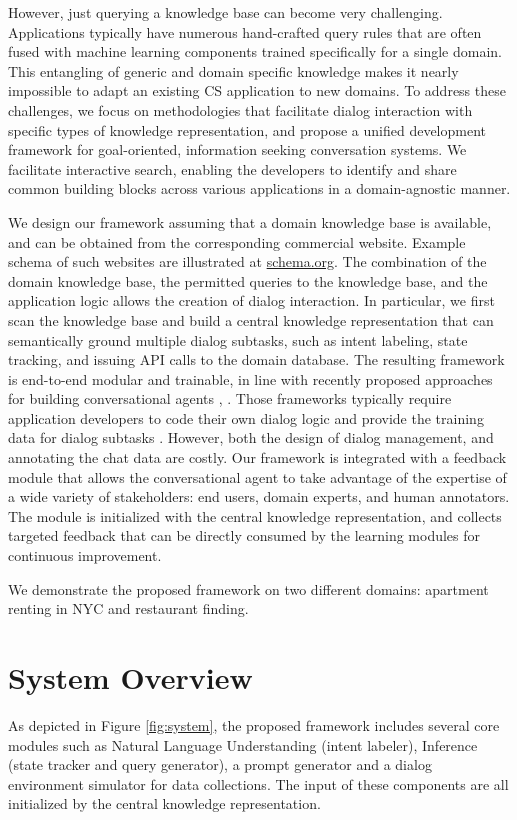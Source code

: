 \documentclass[letterpaper]{article}
\begin{document}
However, just querying a knowledge base can become very challenging. %
Applications typically have numerous hand-crafted query rules that are often fused with machine learning components trained specifically for a single domain. This entangling of generic and domain specific knowledge makes it nearly impossible to adapt an existing CS application to new domains.
To address these challenges, we focus on methodologies that facilitate dialog interaction with specific types of knowledge representation, and propose a unified development framework for goal-oriented, information seeking conversation systems.
We facilitate interactive search, enabling the developers to identify and share common building blocks across various applications in a domain-agnostic manner.


We design our framework assuming that a domain knowledge base is available, and can be obtained from the corresponding commercial website. Example schema of such websites are illustrated at \url{schema.org}. The combination of the domain knowledge base, the permitted queries to the knowledge base, and the application logic
allows the creation of dialog interaction. In particular, we first scan the knowledge base and build a central knowledge representation that can semantically ground multiple dialog subtasks, such as intent labeling, state tracking, and issuing API calls to the domain database. The resulting framework is end-to-end modular and trainable, in line with recently proposed approaches for building conversational agents \cite{rasa}, \cite{truong2017maca}. Those frameworks typically require application developers to code their own dialog logic and provide the training data for dialog subtasks \cite{rasa}. However, both the design of dialog management, and annotating the chat data are costly. Our framework is integrated with a feedback module that allows the conversational agent to take advantage of the expertise of a wide variety of stakeholders: end users,  domain experts, and human annotators. The module is initialized with the central knowledge representation, and collects targeted feedback that can be directly consumed by the learning modules
for continuous improvement.

We demonstrate the proposed framework on two different domains: apartment renting in NYC and restaurant finding.

\section{System Overview}
As depicted in Figure \ref{fig:system}, the proposed framework includes several core modules such as Natural Language Understanding (intent labeler), Inference (state tracker and query generator), a prompt generator and a dialog environment simulator for data collections. The input of these components are all initialized by the central knowledge representation.
\end{document}
